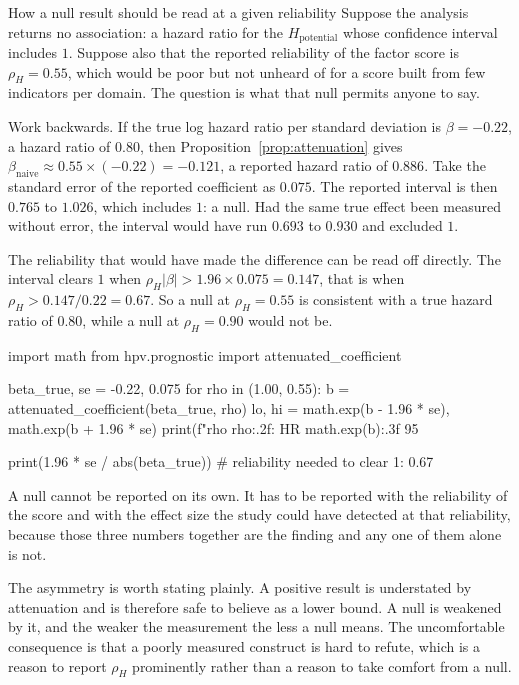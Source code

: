 \begin{workedexample}{How a null result should be read at a given reliability}
Suppose the analysis returns no association: a hazard ratio for the
$H_{\text{potential}}$ whose confidence interval includes $1$. Suppose also
that the reported reliability of the factor score is $\rho_H=0.55$, which would
be poor but not unheard of for a score built from few indicators per domain.
The question is what that null permits anyone to say.

Work backwards. If the true log hazard ratio per standard deviation is
$\beta=-0.22$, a hazard ratio of $0.80$, then
Proposition~\ref{prop:attenuation} gives
$\beta_{\mathrm{naive}}\approx0.55\times(-0.22)=-0.121$, a reported hazard ratio
of $0.886$. Take the standard error of the reported coefficient as $0.075$. The
reported interval is then $0.765$ to $1.026$, which includes $1$: a null. Had
the same true effect been measured without error, the interval would have run
$0.693$ to $0.930$ and excluded $1$.

The reliability that would have made the difference can be read off directly.
The interval clears $1$ when $\rho_H|\beta|>1.96\times0.075=0.147$, that is when
$\rho_H>0.147/0.22=0.67$. So a null at $\rho_H=0.55$ is consistent with a true
hazard ratio of $0.80$, while a null at $\rho_H=0.90$ would not be.

\begin{wecode}[Python]
import math
from hpv.prognostic import attenuated_coefficient

beta_true, se = -0.22, 0.075
for rho in (1.00, 0.55):
    b = attenuated_coefficient(beta_true, rho)
    lo, hi = math.exp(b - 1.96 * se), math.exp(b + 1.96 * se)
    print(f"rho {rho:.2f}: HR {math.exp(b):.3f}  95%

print(1.96 * se / abs(beta_true))   # reliability needed to clear 1: 0.67
\end{wecode}

\end{workedexample}

\begin{reading}
A null cannot be reported on its own. It has to be reported with the
reliability of the score and with the effect size the study could have detected
at that reliability, because those three numbers together are the finding and
any one of them alone is not.

The asymmetry is worth stating plainly. A positive result is understated by
attenuation and is therefore safe to believe as a lower bound. A null is
weakened by it, and the weaker the measurement the less a null means. The
uncomfortable consequence is that a poorly measured construct is hard to refute,
which is a reason to report $\rho_H$ prominently rather than a reason to take
comfort from a null.
\end{reading}

